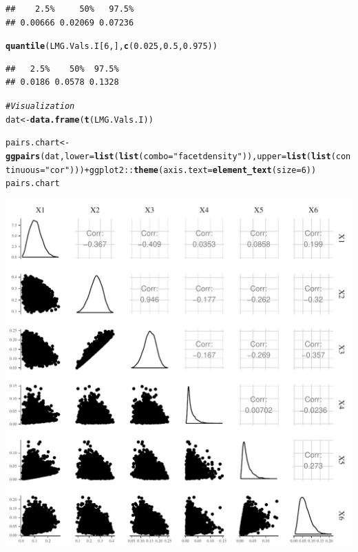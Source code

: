 \documentclass[11pt,a4paper,twoside]{book}\usepackage[]{graphicx}\usepackage[]{color}
\makeatletter
\def\maxwidth{ %
  \ifdim\Gin@nat@width>\linewidth
    \linewidth
  \else
    \Gin@nat@width
  \fi
}
\newcommand{\hlnum}[1]{\textcolor[rgb]{0.686,0.059,0.569}{#1}}%
\newcommand{\hlstr}[1]{\textcolor[rgb]{0.192,0.494,0.8}{#1}}%
\newcommand{\hlcom}[1]{\textcolor[rgb]{0.678,0.584,0.686}{\textit{#1}}}%
\newcommand{\hlopt}[1]{\textcolor[rgb]{0,0,0}{#1}}%
\newcommand{\hlstd}[1]{\textcolor[rgb]{0.345,0.345,0.345}{#1}}%
\newcommand{\hlkwb}[1]{\textcolor[rgb]{0.69,0.353,0.396}{#1}}%
\newcommand{\hlkwc}[1]{\textcolor[rgb]{0.333,0.667,0.333}{#1}}%
\newcommand{\hlkwd}[1]{\textcolor[rgb]{0.737,0.353,0.396}{\textbf{#1}}}%
\newenvironment{kframe}{%
 \def\at@end@of@kframe{}%
 \ifinner\ifhmode%
  \def\at@end@of@kframe{\end{minipage}}%
  \begin{minipage}{\columnwidth}%
 \fi\fi%
 \def\FrameCommand##1{\hskip\@totalleftmargin \hskip-\fboxsep
 \colorbox{shadecolor}{##1}\hskip-\fboxsep
     \hskip-\linewidth \hskip-\@totalleftmargin \hskip\columnwidth}%
 \MakeFramed {\advance\hsize-\width
   \@totalleftmargin\z@ \linewidth\hsize
   \@setminipage}}%
 {\par\unskip\endMakeFramed%
 \at@end@of@kframe}
\newenvironment{knitrout}{}{} %
\makeatother
\begin{document}
\begin{knitrout}
\begin{kframe}
\begin{alltt}
\end{alltt}
\begin{verbatim}
##    2.5%     50%   97.5% 
## 0.00666 0.02069 0.07236
\end{verbatim}
\begin{alltt}
\hlkwd{quantile}\hlstd{(LMG.Vals.I[}\hlnum{6}\hlstd{,],} \hlkwd{c}\hlstd{(}\hlnum{0.025}\hlstd{,} \hlnum{0.5}\hlstd{,} \hlnum{0.975}\hlstd{))}
\end{alltt}
\begin{verbatim}
##   2.5%    50%  97.5% 
## 0.0186 0.0578 0.1328
\end{verbatim}
\begin{alltt}
\hlcom{#Visualization}
\hlstd{dat} \hlkwb{<-} \hlkwd{data.frame}\hlstd{(}\hlkwd{t}\hlstd{(LMG.Vals.I))}

\hlstd{pairs.chart} \hlkwb{<-} \hlkwd{ggpairs}\hlstd{(dat,} \hlkwc{lower} \hlstd{=} \hlkwd{list}\hlstd{(}\hlkwd{list}\hlstd{(}\hlkwc{combo} \hlstd{=} \hlstr{"facetdensity"}\hlstd{)),} \hlkwc{upper} \hlstd{=} \hlkwd{list}\hlstd{(}\hlkwd{list}\hlstd{(}\hlkwc{continuous} \hlstd{=} \hlstr{"cor"}\hlstd{)))} \hlopt{+} \hlstd{ggplot2}\hlopt{::}\hlkwd{theme}\hlstd{(}\hlkwc{axis.text} \hlstd{=} \hlkwd{element_text}\hlstd{(}\hlkwc{size} \hlstd{=} \hlnum{6}\hlstd{))}
\hlstd{pairs.chart}
\end{alltt}
\end{kframe}
\includegraphics[width=\maxwidth]{figure/ch03_figreal_data_LMG-1} 

\end{knitrout}
\end{document}
